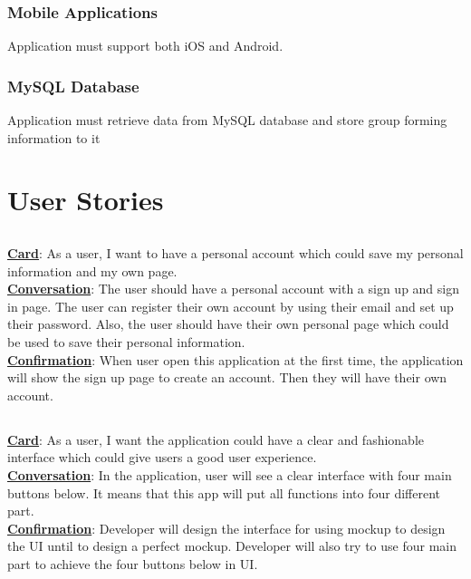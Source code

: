 \documentclass[letterpaper, 10pt,titlepage]{article}
\begin{document}
\subsubsection{Mobile Applications}
Application must support both iOS and Android.
\subsubsection{MySQL Database}
Application must retrieve data from MySQL database and store group forming information to it
\vspace{0.5cm}


\section{User Stories}
\subsection{ }
\textbf{\underline{Card}}: As a user, I want to have a personal account which could save my personal information and my own page.\\ 
\textbf{\underline{Conversation}}: The user should have a personal account with a sign up and sign in page. The user can register their own account by using their email and set up their password. Also, the user should have their own personal page which could be used to save their personal information.\\
\textbf{\underline{Confirmation}}: When user open this application at the first time, the application will show the sign up page to create an account. Then they will have their own account.

\subsection{ }
\textbf{\underline{Card}}: As a user, I want the application could have a clear and fashionable interface which could give users a good user experience.\\
\textbf{\underline{Conversation}}: In the application, user will see a clear interface with four main buttons below. It means that this app will put all functions into four different part.\\
\textbf{\underline{Confirmation}}: Developer will design the interface for using mockup to design the UI until to design a perfect mockup. Developer will also try to use four main part to achieve the four buttons below in UI.
\end{document}
